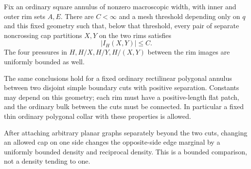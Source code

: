 \begin{proposition}
\label{prop:annular-density}
Fix an ordinary square annulus of nonzero macroscopic width, with
inner and outer rim sets $A,E$.  There are $C<\infty$ and a mesh
threshold depending only on $q$ and this fixed geometry such that,
below that threshold, every pair of separate noncrossing cap
partitions $X,Y$ on the two rims satisfies
\begin{equation}
 |I_H(X,Y)|\le C.
 \label{sector:annular-I}
\end{equation}
The four pressures in $H,H/X,H/Y,H/(X,Y)$ between the rim images
are uniformly bounded as well.

The same conclusions hold for a fixed ordinary rectilinear polygonal
annulus between two disjoint simple boundary cuts with positive
separation.  Constants may depend on this geometry; each rim must
have a positive-length flat patch, and the ordinary bulk between
the cuts must be connected.  In particular a fixed thin ordinary
polygonal collar with these properties is allowed.

After attaching arbitrary planar graphs separately beyond the two
cuts, changing an allowed cap on one side changes the opposite-side
edge marginal by a uniformly bounded density and reciprocal density.
This is a bounded comparison, not a density tending to one.
\end{proposition}

